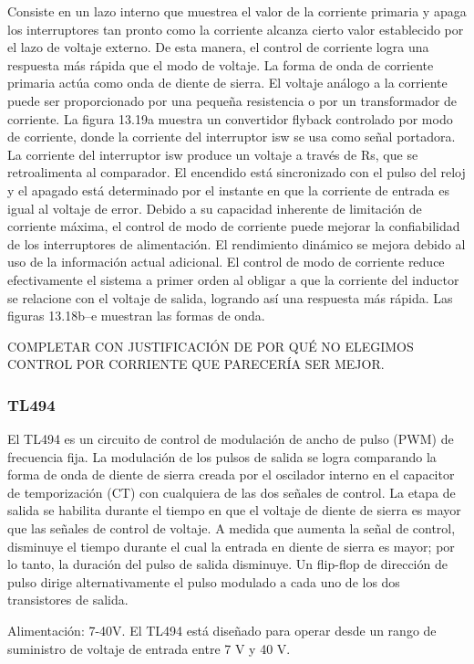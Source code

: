 Consiste en un lazo interno que muestrea el valor de la corriente primaria y apaga los interruptores tan pronto como la corriente alcanza cierto valor establecido por el lazo de voltaje externo. 
De esta manera, el control de corriente logra una respuesta más rápida que el modo de voltaje. 
La forma de onda de corriente primaria actúa como onda de diente de sierra. 
El voltaje análogo a la corriente puede ser proporcionado por una pequeña resistencia o por un transformador de corriente. 
La figura 13.19a muestra un convertidor flyback controlado por modo de corriente, donde la corriente del interruptor isw se usa como señal portadora. 
La corriente del interruptor isw produce un voltaje a través de Rs, que se retroalimenta al comparador. 
El encendido está sincronizado con el pulso del reloj y el apagado está determinado por el instante en que la corriente de entrada es igual al voltaje de error.
Debido a su capacidad inherente de limitación de corriente máxima, el control de modo de corriente puede mejorar la confiabilidad de los interruptores de alimentación. El rendimiento dinámico se mejora debido al uso de la información actual adicional. El control de modo de corriente reduce efectivamente el sistema a primer orden al obligar a que la corriente del inductor se relacione con el voltaje de salida, logrando así una respuesta más rápida. Las figuras 13.18b–e muestran las formas de onda.

COMPLETAR CON JUSTIFICACIÓN DE POR QUÉ NO ELEGIMOS CONTROL POR CORRIENTE QUE PARECERÍA SER MEJOR. 

\subsubsection{TL494}

El TL494 es un circuito de control de modulación de ancho de pulso (PWM) de frecuencia fija. 
La modulación de los pulsos de salida se logra comparando la forma de onda de diente de sierra creada por el oscilador interno en el capacitor de temporización (CT) con cualquiera de las dos señales de control. 
La etapa de salida se habilita durante el tiempo en que el voltaje de diente de sierra es mayor que las señales de control de voltaje. 
A medida que aumenta la señal de control, disminuye el tiempo durante el cual la entrada en diente de sierra es mayor; por lo tanto, la duración del pulso de salida disminuye. 
Un flip-flop de dirección de pulso dirige alternativamente el pulso modulado a cada uno de los dos transistores de salida.

Alimentación: 7-40V.
El TL494 está diseñado para operar desde un rango de suministro de voltaje de entrada entre 7 V y 40 V.

